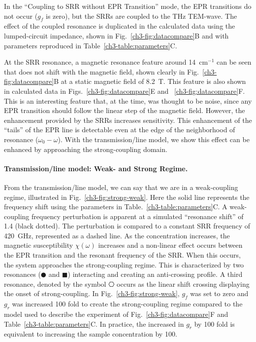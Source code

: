 In the ``Coupling to SRR without EPR Transition'' mode, the EPR transitions do not occur ($g_f$ is zero), but the SRRs are coupled to the THz TEM-wave. The effect of the coupled resonance is duplicated in the calculated data using the lumped-circuit impedance, shown in Fig.~\ref{ch3-fig:datacompare}B and with parameters reproduced in Table~\ref{ch3-table:parameters}C. 

At the SRR resonance, a magnetic resonance feature around 14~cm$^{-1}$ can be seen that does not shift with the magnetic field, shown clearly in Fig.~\ref{ch3-fig:datacompare}B at a static magnetic field of 8.2~T. This feature is also shown in calculated data in Figs.~\ref{ch3-fig:datacompare}E and ~\ref{ch3-fig:datacompare}F. This is an interesting feature that, at the time, was thought to be noise, since any EPR transition should follow the linear step of the magnetic field. However, the enhancement provided by the SRRs increases sensitivity. This enhancement of the ``tails'' of the EPR line is detectable even at the edge of the neighborhood of resonance ($\omega_0-\omega$). With the transmission\-/line model, we show this effect can be enhanced by approaching the strong-coupling domain.

\noindent \paragraph*{Transmission\-/line model: Weak- and Strong Regime.} From the transmission\-/line model, we can say that we are in a weak-coupling regime, illustrated in Fig.~\ref{ch3-fig:strong-weak}. Here the solid line represents the frequency shift using the parameters in Table.~\ref{ch3-table:parameters}C. A weak-coupling frequency perturbation is apparent at a simulated ``resonance shift'' of 1.4 (black dotted). The perturbation is compared to a constant SRR frequency of 420~GHz, represented as a dashed line. As the concentration increases, the magnetic susceptibility $\chi(\omega)$ increases and a non-linear effect occurs between the EPR transition and the resonant frequency of the SRR. When this occurs, the system approaches the strong-coupling regime. This is characterized by two resonances ($\CIRCLE$ and $\blacksquare$) interacting and creating an anti-crossing profile. A third resonance, denoted by the symbol $\hexagon$ occurs as the linear shift crossing displaying the onset of strong-coupling. In Fig.~\ref{ch3-fig:strong-weak}, $g_f$ was set to zero and $g_r$ was increased 100 fold to create the strong-coupling regime compared to the model used to describe the experiment of Fig.~\ref{ch3-fig:datacompare}F and Table~\ref{ch3-table:parameters}C. In practice, the increased in $g_r$ by 100 fold is equivalent to increasing the sample concentration by 100.

